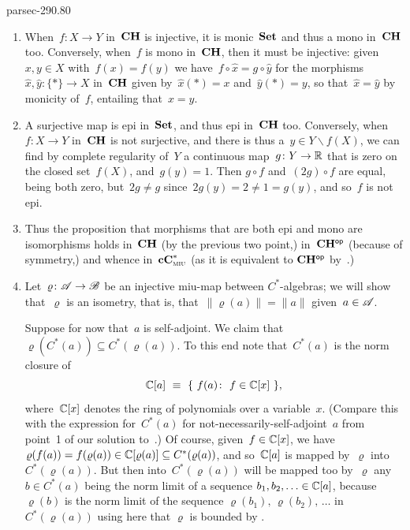 \documentclass[b5page]{book}
\begin{document}
\begin{solution}{parsec-290.80}
\begin{enumerate}
\item
When~$f\colon X\to Y$ in~$\mathbf{CH}$ is injective,
it is monic~$\mathbf{Set}$ and thus a mono in~$\mathbf{CH}$ too.
Conversely,
when~$f$ is mono in~$\mathbf{CH}$,
then it must be injective:
given~$x,y\in X$
with~$f(x)=f(y)$
we have~$f\circ \hat{x}=g\circ \hat{y}$
for the morphisms $\hat{x},\hat{y}\colon \{\ast\}\to X$
in~$\mathbf{CH}$
given by~$\hat{x}(\ast)=x$ and~$\hat{y}(\ast)=y$,
so that~$\hat{x}=\hat{y}$
by monicity of~$f$,
entailing that~$x=y$.
\item
A surjective map is epi in~$\mathbf{Set}$, and thus epi in~$\mathbf{CH}$ too.
Conversely, 
when~$f\colon X\to Y$ in~$\mathbf{CH}$ is not surjective,
and there is thus a~$y\in Y\backslash f(X)$,
we can find by complete regularity of~$Y$
a continuous map~$g\colon Y\to \mathbb{R}$ 
that is zero on
the closed set~$f(X)$,
and~$g(y)=1$.
Then $g\circ f$ and~$(2g)\circ f$ are equal,
being both zero,
but~$2g\neq g$
since~$2g(y)=2\neq 1=g(y)$,
and so~$f$ is not epi.
\item
Thus the proposition
that morphisms that are both epi and mono are isomorphisms
holds
in~$\mathbf{CH}$ (by the previous two point,)
in~${\mathbf{CH}}{^{\mathsf{op}}}$ (because of symmetry,)
and whence in~$\mathbf{cC}^*_{\text{\textsc{miu}}}$ (as
it is
equivalent to ${\mathbf{CH}}{^{\mathsf{op}}}$ by~.)
\item
\label{S29VIII3}
Let~$\varrho\colon \mathscr{A}\to\mathscr{B}$
be an injective miu-map between $C^*$-algebras;
we will show that~$\varrho$ is an isometry,
that is, 
that~$\|\varrho(a)\|=\|a\|$ given~$a\in \mathscr{A}$.

Suppose for now that~$a$ is self-adjoint.
We claim that~$\varrho(C^*(a))\subseteq C^*(\varrho(a))$.
To this end note
that~$C^*(a)$
is the norm closure
of
$$\C[a]\ \equiv\  \{\ f(a)\colon \ f\in\C[x]\ \},$$
where~$\mathbb{C}[x]$ denotes the ring of polynomials over a variable~$x$.
(Compare this with the expression for~$C^*(a)$
for not-necessarily-self-adjoint~$a$ from 
point~1 of our solution to~.)
Of course, given~$f\in \mathbb{C}[x]$,
we have~$\varrho(f(a))=f(\varrho(a))\in \mathbb{C}[\varrho(a)]\subseteq
C^*(\varrho(a))$,
and so~$\mathbb{C}[a]$ is mapped by~$\varrho$ into~$C^*(\varrho(a))$.
But then into~$C^*(\varrho(a))$
will be mapped too
by~$\varrho$
any~$b\in C^*(a)$ being the norm limit
of a sequence $b_1,b_2,\dotsc\in \mathbb{C}[a]$,
because $\varrho(b)$
is the norm limit of
the sequence 
$\varrho(b_1),\,\varrho(b_2),\,\dotsc$ in $C^*(\varrho(a))$
using here that $\varrho$ is bounded by .


\end{enumerate}
\end{solution}
\end{document}
